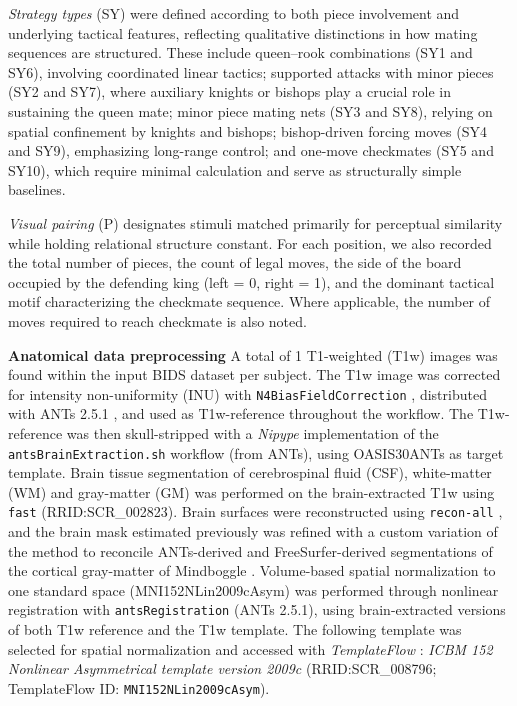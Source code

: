 \emph{Strategy types} (SY) were defined according to both piece involvement and underlying tactical features, reflecting qualitative distinctions in how mating sequences are structured. These include queen–rook combinations (SY1 and SY6), involving coordinated linear tactics; supported attacks with minor pieces (SY2 and SY7), where auxiliary knights or bishops play a crucial role in sustaining the queen mate; minor piece mating nets (SY3 and SY8), relying on spatial confinement by knights and bishops; bishop-driven forcing moves (SY4 and SY9), emphasizing long-range control; and one-move checkmates (SY5 and SY10), which require minimal calculation and serve as structurally simple baselines.

\emph{Visual pairing} (P) designates stimuli matched primarily for perceptual similarity while holding relational structure constant. For each position, we also recorded the total number of pieces, the count of legal moves, the side of the board occupied by the defending king (left = 0, right = 1), and the dominant tactical motif characterizing the checkmate sequence. Where applicable, the number of moves required to reach checkmate is also noted.

\label{suppsec:fmri-preproc}
\textbf{Anatomical data preprocessing} 
A total of 1 T1-weighted (T1w) images was found within the input BIDS dataset per subject. The T1w image was corrected for intensity non-uniformity (INU) with \texttt{N4BiasFieldCorrection} \cite{n4}, distributed with ANTs 2.5.1 \cite[RRID:SCR\_004757]{ants}, and used as T1w-reference throughout the workflow. The T1w-reference was then skull-stripped with a \emph{Nipype} implementation of the \texttt{antsBrainExtraction.sh} workflow (from ANTs), using OASIS30ANTs as target template. Brain tissue segmentation of cerebrospinal fluid (CSF), white-matter (WM) and gray-matter (GM) was performed on the brain-extracted T1w using \texttt{fast} \cite{fsl_fast} (RRID:SCR\_002823). Brain surfaces were reconstructed using \texttt{recon-all} \cite[FreeSurfer 7.3.2, RRID:SCR\_001847,][]{fs_reconall}, and the brain mask estimated previously was refined with a custom variation of the method to reconcile ANTs-derived and FreeSurfer-derived segmentations of the cortical gray-matter of Mindboggle \cite[RRID:SCR\_002438,][]{mindboggle}. Volume-based spatial normalization to one standard space (MNI152NLin2009cAsym) was performed through nonlinear registration with \texttt{antsRegistration} (ANTs 2.5.1), using brain-extracted versions of both T1w reference and the T1w template. The following template was selected for spatial normalization and accessed with \emph{TemplateFlow}
\cite[24.2.0,][]{templateflow}: \emph{ICBM 152 Nonlinear Asymmetrical template version 2009c} \cite{mni152nlin2009casym} (RRID:SCR\_008796; TemplateFlow ID: \texttt{MNI152NLin2009cAsym}).

